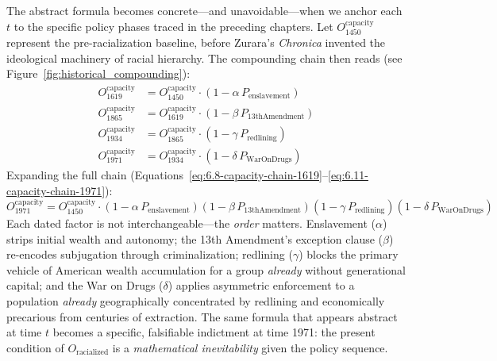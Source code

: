 The abstract formula becomes concrete---and unavoidable---when we anchor each $t$ to the specific policy phases traced in the preceding chapters. Let $O_{1450}^{\text{capacity}}$ represent the pre-racialization baseline, before Zurara's \textit{Chronica} invented the ideological machinery of racial hierarchy. The compounding chain then reads (see Figure~\ref{fig:historical_compounding}):
\begin{align}
O_{1619}^{\text{capacity}} &= O_{1450}^{\text{capacity}} \cdot (1 - \alpha\, P_{\text{enslavement}}) \label{eq:6.8-capacity-chain-1619}\\[4pt]
O_{1865}^{\text{capacity}} &= O_{1619}^{\text{capacity}} \cdot (1 - \beta\, P_{\text{13thAmendment}}) \label{eq:6.9-capacity-chain-1865}\\[4pt]
O_{1934}^{\text{capacity}} &= O_{1865}^{\text{capacity}} \cdot (1 - \gamma\, P_{\text{redlining}}) \label{eq:6.10-capacity-chain-1934}\\[4pt]
O_{1971}^{\text{capacity}} &= O_{1934}^{\text{capacity}} \cdot (1 - \delta\, P_{\text{WarOnDrugs}}) \label{eq:6.11-capacity-chain-1971}
\end{align}
Expanding the full chain (Equations~\ref{eq:6.8-capacity-chain-1619}--\ref{eq:6.11-capacity-chain-1971}):
\begin{equation}\label{eq:6.12-capacity-compounding-full}
O_{1971}^{\text{capacity}} = O_{1450}^{\text{capacity}} \cdot (1-\alpha\, P_{\text{enslavement}})(1-\beta\, P_{\text{13thAmendment}})(1-\gamma\, P_{\text{redlining}})(1-\delta\, P_{\text{WarOnDrugs}})
\end{equation}
Each dated factor is not interchangeable---the \textit{order} matters. Enslavement ($\alpha$) strips initial wealth and autonomy; the 13th Amendment's exception clause ($\beta$) re-encodes subjugation through criminalization; redlining ($\gamma$) blocks the primary vehicle of American wealth accumulation for a group \textit{already} without generational capital; and the War on Drugs ($\delta$) applies asymmetric enforcement to a population \textit{already} geographically concentrated by redlining and economically precarious from centuries of extraction. The same formula that appears abstract at time $t$ becomes a specific, falsifiable indictment at time 1971: the present condition of $O_{\text{racialized}}$ is a \textit{mathematical inevitability} given the policy sequence.

